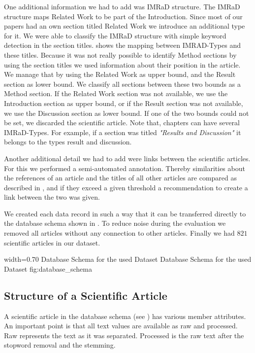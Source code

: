 One additional information we had to add was IMRaD structure. The IMRaD structure maps Related Work to be part of the Introduction. Since most of our papers had an own section titled Related Work we introduce an additional type for it. We were able to classify the IMRaD structure with simple keyword detection in the section titles.  shows the mapping between IMRAD-Types and these titles. Because it was not really possible to identify Method sections by using the section titles we used information about their position in the article. We manage that by using the Related Work as upper bound, and the Result section as lower bound. We classify all sections between these two bounds as a Method section. If the Related Work section was not available, we use the Introduction section as upper bound, or if the Result section was not available, we use the Discussion section as lower bound. If one of the two bounds could not be set, we discarded the scientific article. Note that, chapters can have several IMRaD-Types. For example, if a section was titled \textit{"Results and Discussion"} it belongs to the types result and discussion.

Another additional detail we had to add were links between the scientific articles. For this we performed a semi-automated annotation. Thereby similarities about the references of an article and the titles of all other articles are compared as described in , and if they exceed a given threshold a recommendation to create a link between the two was given.

We created each data record in such a way that it can be transferred directly to the database schema shown in . To reduce noise during the evaluation we removed all articles without any connection to other articles. Finally we had $821$ scientific articles in our dataset.

      {width=0.70\textwidth}
      {Database Schema for the used Dataset}
      {Database Schema for the used Dataset}
      {fig:database_schema}

\subsection{Structure of a Scientific Article}
\label{sec:structure_scientific_article}

A scientific article in the database schema (see ) has various member attributes. An important point is that all text values are available as raw and processed. Raw represents the text as it was separated. Processed is the raw text after the stopword removal and the stemming.

